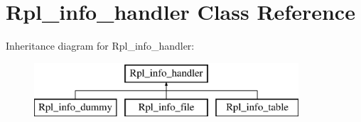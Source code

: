 \hypertarget{classRpl__info__handler}{}\section{Rpl\+\_\+info\+\_\+handler Class Reference}
\label{classRpl__info__handler}
Inheritance diagram for Rpl\+\_\+info\+\_\+handler\+:\begin{figure}[H]
\begin{center}
\leavevmode
\includegraphics[height=2.000000cm]{classRpl__info__handler}
\end{center}
\end{figure}
